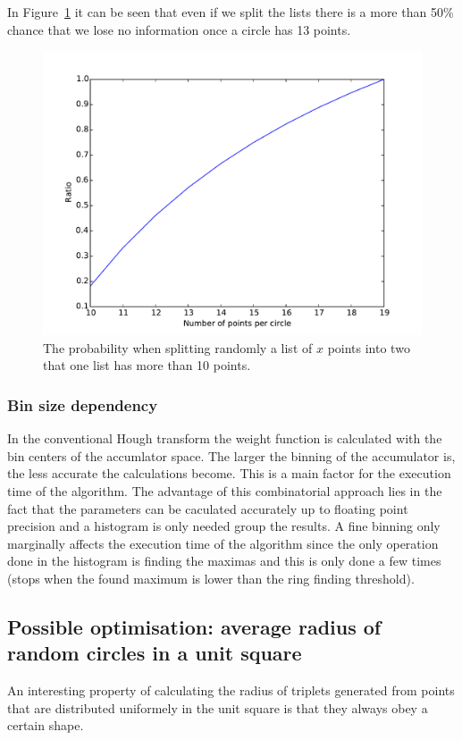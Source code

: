 \documentclass[11pt,twoside]{scrreprt}
\begin{document}
In Figure~\ref{fig:ratios} it can be seen that even if we split the lists there is a more 
than 50\% chance that we lose no information once a circle has 13 points.
\begin{figure}[htb]
  \centering
  \includegraphics[width=\textwidth]{pics/ratio.pdf}
  \caption{The probability when splitting randomly a list of $x$ points into two that one list has more than 10 points.}
  \label{fig:ratios}
\end{figure}

\subsubsection{Bin size dependency} %
\label{ssub:bin_size_dependency}
In the conventional Hough transform the weight function is calculated with the
bin centers of the accumlator space. The larger the binning of the accumulator is, the less accurate the calculations become. This is a main factor for the execution time of the algorithm. The advantage of this combinatorial approach lies in the fact that the parameters can be caculated
accurately up to floating point precision and a histogram is only needed group the results. A fine binning only marginally affects the execution time of the algorithm since the only operation done in the histogram is finding the maximas and this is only done a few times (stops when the found maximum is lower than the ring finding threshold).


\subsection{Possible optimisation: average radius of random circles in a unit square} %
\label{ssub:average_radius_of_random_circles_in_a_unit_square}
An interesting property of calculating the radius of triplets generated from points that are distributed uniformely in the unit square is 
that they always obey a certain shape.
\end{document}

